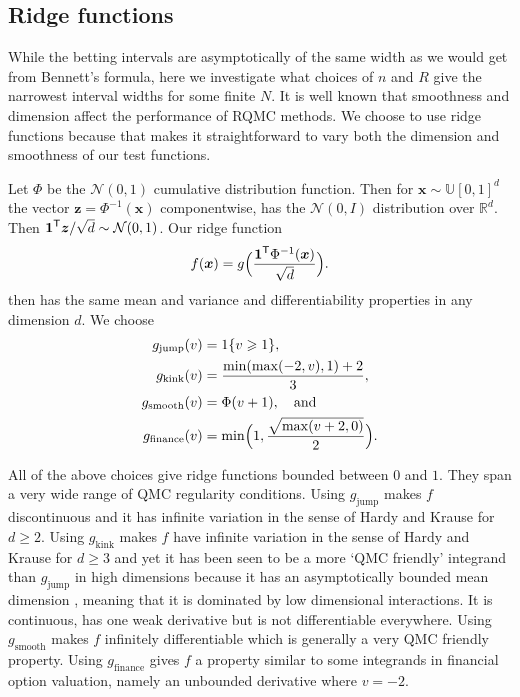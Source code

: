 \documentclass{article}
\newcommand{\art}[1]{\begingroup\color{blue}#1\endgroup}
\renewcommand{\ge}{\geqslant}
\newcommand{\real}{\mathbb{R}}
\newcommand{\tran}{\mathsf{\scriptsize T}}
\newcommand{\bsx}{\boldsymbol{x}}
\newcommand{\bsz}{\boldsymbol{z}}
\newcommand{\bsone}{\boldsymbol{1}}
\newcommand{\dunif}{\mathbb{U}}
\newcommand{\dnorm}{\mathcal{N}}
\newcommand{\jmp}{\mathrm{jump}}
\newcommand{\knk}{\mathrm{kink}}
\newcommand{\smo}{\mathrm{smooth}}
\newcommand{\fin}{\mathrm{finance}}
\begin{document}

\subsection{Ridge functions}

While the betting intervals are asymptotically of the
same width as we would get from Bennett's formula, here
we investigate what choices of $n$ and $R$ give the
narrowest interval widths for some finite $N$. 
\art{It is well known that smoothness and dimension affect
the performance of RQMC methods.
We choose to use ridge functions because that makes it
straightforward to vary both the dimension and
smoothness of our test functions.}

Let $\Phi$ be the $\dnorm(0,1)$ cumulative distribution function.
Then for $\bsx\sim\dunif[0,1]^d$ the vector
$\bsz=\Phi^{-1}(\bsx)$ componentwise,
has the $\dnorm(0,I)$ distribution over $\real^d$.
Then $\bsone^\tran\bsz/\sqrt{d}\sim\dnorm(0,1)$.
Our ridge function
$$
f(\bsx) =g\Bigl( \frac{\bsone^\tran\Phi^{-1}(\bsx)}{\sqrt{d}}\Bigr).
$$
then has the same mean and variance and differentiability properties
in any dimension $d$.  We choose
\begin{align*}
g_\jmp(v) &= 1\{v\ge1\},\\
g_\knk(v) & = \frac{\min(\max(-2,v),1)+2}3,\\
g_\smo(v) & = \Phi(v+1),\quad\text{and}\\
g_\fin(v) & = \min\Bigl(1,\frac{\sqrt{\max(v+2,0)}}2\Bigr).
\end{align*}

All of the above choices give ridge functions bounded between $0$ and $1$.
They span a very wide range of QMC regularity conditions.
Using $g_\jmp$ \art{makes $f$ discontinuous}
and it has infinite variation in
the sense of Hardy and Krause for $d\ge2$. 
Using $g_\knk$ makes $f$ have infinite variation in
the sense of Hardy and Krause for $d\ge3$ and yet
it has been seen to be a more `QMC friendly' integrand
than $g_\jmp$ in high dimensions because it has an
asymptotically bounded mean dimension \cite{mdridge},
meaning that it is dominated by low dimensional 
interactions.  \art{It is continuous, has one weak derivative
but is not differentiable everywhere.} Using $g_\smo$ makes $f$ infinitely
differentiable which is generally a very QMC friendly
property.  Using $g_\fin$ gives $f$ a property
similar to some integrands in financial option valuation, namely an
unbounded derivative where $v=-2$.
\end{document}
